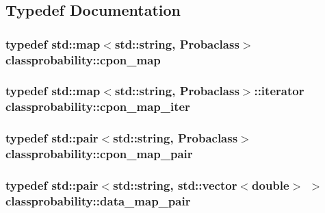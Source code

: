 \subsection{Typedef Documentation}
\subsubsection[{\texorpdfstring{cpon\+\_\+map}{cpon_map}}]{\setlength{\rightskip}{0pt plus 5cm}typedef std\+::map$<$std\+::string, {\bf Probaclass}$>$ {\bf classprobability\+::cpon\+\_\+map}}\hypertarget{namespaceclassprobability_a9b76324c0524b1c0c9d52954f83ad037}{}\label{namespaceclassprobability_a9b76324c0524b1c0c9d52954f83ad037}
\subsubsection[{\texorpdfstring{cpon\+\_\+map\+\_\+iter}{cpon_map_iter}}]{\setlength{\rightskip}{0pt plus 5cm}typedef std\+::map$<$std\+::string, {\bf Probaclass}$>$\+::iterator {\bf classprobability\+::cpon\+\_\+map\+\_\+iter}}\hypertarget{namespaceclassprobability_a1920ccfc2fa10ecbb9388bb967ff2efc}{}\label{namespaceclassprobability_a1920ccfc2fa10ecbb9388bb967ff2efc}
\subsubsection[{\texorpdfstring{cpon\+\_\+map\+\_\+pair}{cpon_map_pair}}]{\setlength{\rightskip}{0pt plus 5cm}typedef std\+::pair$<$std\+::string, {\bf Probaclass}$>$ {\bf classprobability\+::cpon\+\_\+map\+\_\+pair}}\hypertarget{namespaceclassprobability_af9fe3e67e0088680cf2535772e5f5139}{}\label{namespaceclassprobability_af9fe3e67e0088680cf2535772e5f5139}
\subsubsection[{\texorpdfstring{data\+\_\+map\+\_\+pair}{data_map_pair}}]{\setlength{\rightskip}{0pt plus 5cm}typedef std\+::pair$<$std\+::string, std\+::vector$<$double$>$ $>$ {\bf classprobability\+::data\+\_\+map\+\_\+pair}}\hypertarget{namespaceclassprobability_a88fdc064106d9d4c13e14223f57457e9}{}\label{namespaceclassprobability_a88fdc064106d9d4c13e14223f57457e9}
